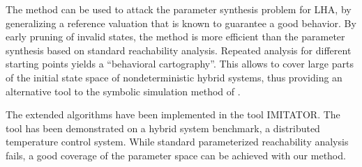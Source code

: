 \documentclass{llncs}
\newcommand{\A}{\ensuremath{\mathcal{A}}}
\newcommand{\trans}[1]{\ensuremath{\overset{#1}{\rightarrow}}}
\newcommand{\Trans}[1]{\ensuremath{\overset{#1}{\Rightarrow}}}
\begin{document}
The method can be used to attack the parameter synthesis problem for
LHA, by generalizing a reference valuation that is known to guarantee
a good behavior. By early pruning of invalid states, the method is
more efficient than the parameter synthesis based on standard
reachability analysis.  Repeated analysis for different starting
points yields a ``behavioral cartography''. This allows to cover
large parts of the initial state space of nondeterministic hybrid
systems, thus providing an alternative tool to the symbolic simulation
method of \cite{AKRS:2008}.

The extended algorithms have been implemented in the tool
IMITATOR. The tool has been demonstrated on a hybrid system benchmark,
a distributed temperature control system. While standard
parameterized reachability analysis fails, a good coverage of the
parameter space can be achieved with our method.





\appendix
\clearpage










\end{document}
